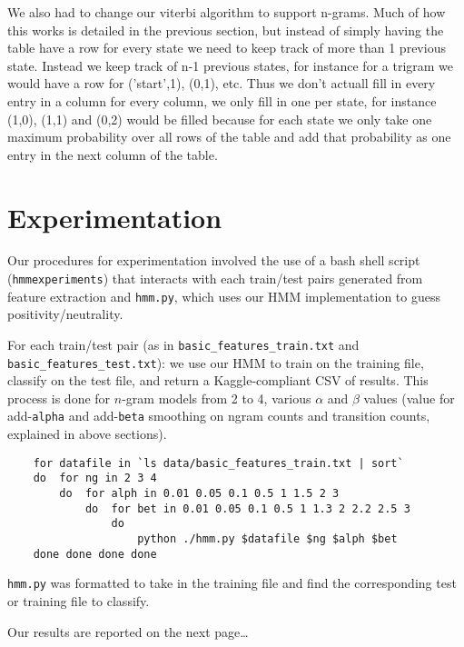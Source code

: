 \documentclass{article}
\begin{document}
We also had to change our viterbi algorithm to support n-grams. Much of how this works is detailed in the previous section, but instead of simply having the table have a row for every state we need to keep track of more than 1 previous state. Instead we keep track of n-1 previous states, for instance for a trigram we would have a row for ('start',1), (0,1), etc. Thus we don't actuall fill in every entry in a column for every column, we only fill in one per state, for instance (1,0), (1,1) and (0,2) would be filled because for each state we only take one maximum probability over all rows of the table and add that probability as one entry in the next column of the table.

\section{Experimentation}

Our procedures for experimentation involved the use of a bash shell script (\texttt{hmmexperiments}) that interacts with each train/test pairs generated from feature extraction and \texttt{hmm.py}, which uses our HMM implementation to guess positivity/neutrality.\par

For each train/test pair (as in \texttt{basic\_features\_train.txt} and \texttt{basic\_features\_test.txt}): we use our HMM to train on the training file, classify on the test file, and return a Kaggle-compliant CSV of results. This process is done for $n$-gram models from 2 to 4, various $\alpha$ and $\beta$ values (value for add-\texttt{alpha} and add-\texttt{beta} smoothing on ngram counts and transition counts, explained in above sections).\par

\begin{verbatim}
    for datafile in `ls data/basic_features_train.txt | sort`
    do  for ng in 2 3 4
        do  for alph in 0.01 0.05 0.1 0.5 1 1.5 2 3
            do  for bet in 0.01 0.05 0.1 0.5 1 1.3 2 2.2 2.5 3
                do
                    python ./hmm.py $datafile $ng $alph $bet
    done done done done
\end{verbatim}

\texttt{hmm.py} was formatted to take in the training file and find the corresponding test or training file to classify.

\par\bigskip

Our results are reported on the next page\ldots
\end{document}
